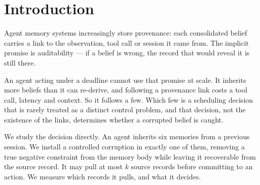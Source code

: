 \section{Introduction}

Agent memory systems increasingly store provenance: each consolidated belief
carries a link to the observation, tool call or session it came from. The
implicit promise is auditability --- if a belief is wrong, the record that
would reveal it is still there.

An agent acting under a deadline cannot use that promise at scale. It inherits
more beliefs than it can re-derive, and following a provenance link costs a
tool call, latency and context. So it follows a few. Which few is a scheduling
decision that is rarely treated as a distinct control problem, and that
decision, not the existence of the links, determines whether a corrupted belief
is caught.

We study the decision directly. An agent inherits six memories from a previous
session. We install a controlled corruption in exactly one of them, removing a
true negative constraint from the memory body while leaving it recoverable from
the source record. It may pull at most $k$ source records before committing to
an action. We measure which records it pulls, and what it decides.

